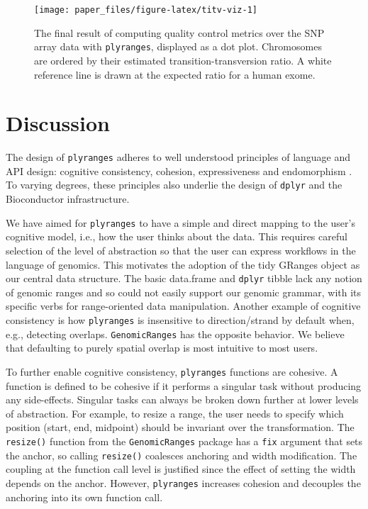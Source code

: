 \documentclass[]{article}
\begin{document}
\begin{figure}

{\centering \texttt{[image: paper\_files/figure-latex/titv-viz-1]} 

}

\caption{The final result of computing quality control metrics over the SNP array data with \texttt{plyranges}, displayed as a dot plot. Chromosomes are ordered by their estimated transition-transversion ratio. A white reference line is drawn at the expected ratio for a human exome.}\label{fig:titv-viz}
\end{figure}

\hypertarget{discussion}{%
\section{Discussion}\label{discussion}}

The design of \texttt{plyranges} adheres to well understood principles
of language and API design: cognitive consistency, cohesion,
expressiveness and endomorphism \cite{Green1996-qg}. To varying degrees,
these principles also underlie the design of \texttt{dplyr} and the
Bioconductor infrastructure.

We have aimed for \texttt{plyranges} to have a simple and direct mapping
to the user's cognitive model, i.e., how the user thinks about the data.
This requires careful selection of the level of abstraction so that the
user can express workflows in the language of genomics. This motivates
the adoption of the tidy GRanges object as our central data structure.
The basic data.frame and \texttt{dplyr} tibble lack any notion of
genomic ranges and so could not easily support our genomic grammar, with
its specific verbs for range-oriented data manipulation. Another example
of cognitive consistency is how \texttt{plyranges} is insensitive to
direction/strand by default when, e.g., detecting overlaps.
\texttt{GenomicRanges} has the opposite behavior. We believe that
defaulting to purely spatial overlap is most intuitive to most users.

To further enable cognitive consistency, \texttt{plyranges} functions
are cohesive. A function is defined to be cohesive if it performs a
singular task without producing any side-effects. Singular tasks can
always be broken down further at lower levels of abstraction. For
example, to resize a range, the user needs to specify which position
(start, end, midpoint) should be invariant over the transformation. The
\texttt{resize()} function from the \texttt{GenomicRanges} package has a
\texttt{fix} argument that sets the anchor, so calling \texttt{resize()}
coalesces anchoring and width modification. The coupling at the function
call level is justified since the effect of setting the width depends on
the anchor. However, \texttt{plyranges} increases cohesion and decouples
the anchoring into its own function call.
\end{document}
